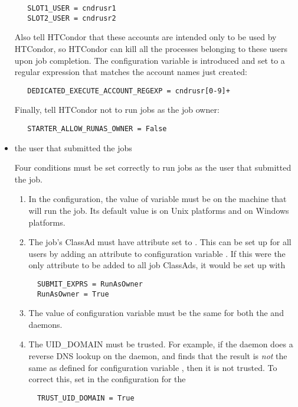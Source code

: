 \begin{itemize}
\begin{verbatim}
   SLOT1_USER = cndrusr1
   SLOT2_USER = cndrusr2
\end{verbatim}

Also tell HTCondor that these accounts are intended only to be used by HTCondor,
so HTCondor can kill all the processes belonging to these users upon
job completion.
The configuration variable 
is introduced and set to a regular expression that matches the account
names just created:

\begin{verbatim}
   DEDICATED_EXECUTE_ACCOUNT_REGEXP = cndrusr[0-9]+
\end{verbatim}

Finally, tell HTCondor not to run jobs as the job owner:

\begin{verbatim}
   STARTER_ALLOW_RUNAS_OWNER = False
\end{verbatim}

\item the user that submitted the jobs

Four conditions must be set correctly to run jobs as the user
that submitted the job.
\begin{enumerate}
\item In the configuration, the value of variable
 must be  on the
machine that will run the job.
Its default value is  on Unix platforms
and  on Windows platforms.
\item The job's ClassAd must have attribute 
set to .
This can be set up for all users by adding an attribute to
configuration variable .
If this were the only attribute to be added to all job ClassAds,
it would be set up with
\begin{verbatim}
  SUBMIT_EXPRS = RunAsOwner
  RunAsOwner = True
\end{verbatim}
\item The value of configuration variable  must be
the same for both the  and  daemons.
\item The UID\_DOMAIN must be trusted.
For example,  if the  daemon does a reverse DNS lookup
on the  daemon,
and finds that the result is \emph{not} the same as defined for
configuration variable ,
then it is not trusted.
To correct this,  set in the configuration for the 
\begin{verbatim}
  TRUST_UID_DOMAIN = True
\end{verbatim}
\end{enumerate}

\end{itemize}


